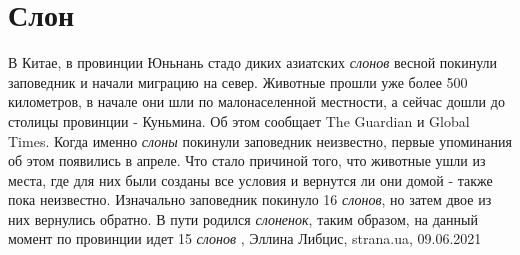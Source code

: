  
 
 
 
 
\chapter{Слон}
\label{sec:slova.slon}

В Китае, в провинции Юньнань стадо диких азиатских \emph{слонов} весной покинули
заповедник и начали миграцию на север. Животные прошли уже более 500
километров, в начале они шли по малонаселенной местности, а сейчас дошли до
столицы провинции - Куньмина.  Об этом сообщает The Guardian и Global Times.
Когда именно \emph{слоны} покинули заповедник неизвестно, первые упоминания об этом
появились в апреле. Что стало причиной того, что животные ушли из места, где
для них были созданы все условия и вернутся ли они домой - также пока
неизвестно. Изначально заповедник покинуло 16 \emph{слонов}, но затем двое из них
вернулись обратно. В пути родился \emph{слоненок}, таким образом, на данный момент по
провинции идет 15 \emph{слонов}
, Эллина Либцис, strana.ua, 09.06.2021

